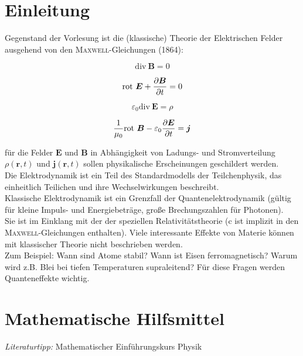 \chapter{Einleitung}
Gegenstand der Vorlesung ist die (klassische) Theorie der Elektrischen Felder ausgehend von den \textsc{Maxwell}-Gleichungen (1864):

\begin{equation*}
\text{div} \ \bm{B}=0
\end{equation*}

\begin{equation*}
\text{rot} \ \bm{E}+\pdiff{\bm{B}}{t}=0
\end{equation*}

\begin{equation*}
\varepsilon_0\text{div} \ \bm{E}=\rho
\end{equation*}

\begin{equation*}
\frac{1}{\mu_0}\text{rot} \ \bm{B}-\varepsilon_0\pdiff{\bm{E}}{t}=\bm{j}
\end{equation*}

für die Felder $\bm{E}$ und $\bm{B}$ in Abhängigkeit von Ladungs- und Stromverteilung $\rho(\bm{r},t)$ und $\bm{j}(\bm{r},t)$  sollen physikalische Erscheinungen geschildert werden.\\
Die Elektrodynamik ist ein Teil des Standardmodells der Teilchenphysik, das einheitlich Teilichen und ihre Wechselwirkungen beschreibt.\\
Klassische Elektrodynamik ist ein Grenzfall der Quantenelektrodynamik (gültig für kleine Impuls- und Energiebeträge, große Brechungszahlen für Photonen).\\
Sie ist im Einklang mit der der speziellen Relativitätstheorie (c ist implizit in den \textsc{Maxwell}-Gleichungen enthalten). Viele interessante Effekte von Materie können mit klassischer Theorie nicht beschrieben werden.\\
Zum Beispiel: Wann sind Atome stabil? Wann ist Eisen ferromagnetisch? Warum wird z.B. Blei bei tiefen Temperaturen supraleitend? Für diese Fragen werden Quanteneffekte wichtig.
\chapter{Mathematische Hilfsmittel}
\emph{Literaturtipp:} Mathematischer Einführungskurs Physik\\
\linebreak
